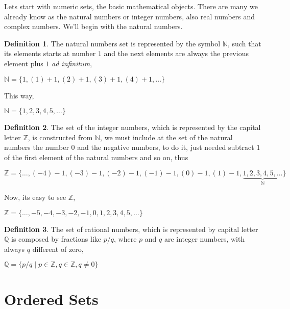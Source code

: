 \documentclass[11pt, a4paper]{amsart}
\numberwithin{equation}{section}
\theoremstyle{plain} %
\theoremstyle{definition}
\newtheorem{defn}{Definition}[section]
\theoremstyle{remark}
\begin{document}
Lets start with numeric sets, the basic mathematical objects. There are many we already know as the natural numbers or integer numbers, also real numbers and complex numbers. We'll begin with the natural numbers.

\begin{defn}
    The natural numbers set is represented by the symbol $\mathbb{N}$, such that its elements starts at number $1$ and the next elements are always the previous element plus $1$ \textit{ad infinitum},
    \begin{center}
        $\mathbb{N}=\lbrace1,(1)+1,(2)+1,(3)+1,(4)+1,\dots\rbrace$
    \end{center}
    This way,
    \begin{center}
        $\mathbb{N}=\lbrace1,2,3,4,5,\dots\rbrace$
    \end{center}
\end{defn}
\begin{defn}
The set of the integer numbers, which is represented by the capital letter $\mathbb{Z}$, is constructed from $\mathbb{N}$, we must include at the set of the natural numbers the number $0$ and the negative numbers, to do it, just needed subtract $1$ of the first element of the natural numbers and so on, thus
\begin{center}
    $\mathbb{Z}=\lbrace\dots,(-4)-1, (-3)-1, (-2)-1, (-1)-1, (0)-1, (1)-1, \underbrace{1, 2, 3, 4, 5, \dots}_{\mathbb{N}}\rbrace$
\end{center}

Now, its easy to see $\mathbb{Z}$,

\begin{center}
    $\mathbb{Z}=\lbrace\dots, -5, -4, -3, -2, -1, 0, 1, 2, 3, 4, 5, \dots\rbrace$
\end{center}
\end{defn}

\begin{defn}
The set of rational numbers, which is represented by capital letter $\mathbb{Q}$ is composed by fractions like $p/q$, where $p$ and $q$ are integer numbers, with always $q$ different of zero,
\begin{center}
    $\mathbb{Q}=\lbrace p/q\mid p\in\mathbb{Z}, q\in \mathbb{Z}, q\neq0\rbrace$ 
\end{center}
\end{defn}

\section{Ordered Sets}
\end{document}
